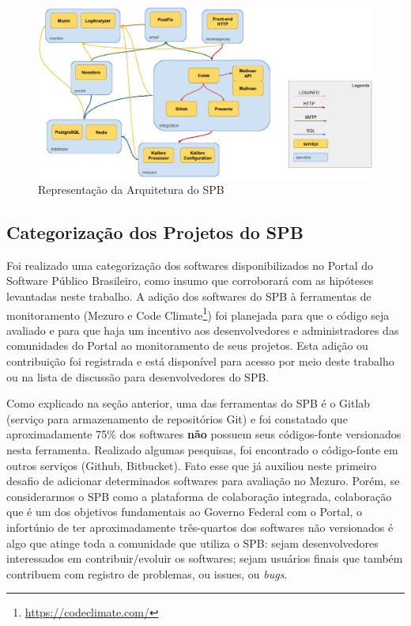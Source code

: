 \begin{figure}[!htb]
	\centering
    \includegraphics[keepaspectratio=true,scale=0.3]
    {figuras/arquitetura_spb.eps}
  \caption{Representação da Arquitetura do SPB}
  \label{fig:arquitetura_spb}
\end{figure}

\subsection{Categorização dos Projetos do SPB}

Foi realizado uma categorização dos softwares disponibilizados no Portal do
Software Público Brasileiro, como insumo que corroborará com as hipóteses
levantadas neste trabalho. A adição dos softwares do SPB à ferramentas de
monitoramento (Mezuro e Code Climate\footnote{\url{https://codeclimate.com/}})
foi planejada para que o código seja avaliado e para que haja um incentivo aos
desenvolvedores e administradores das comunidades do Portal ao monitoramento de
seus projetos. Esta adição ou contribuição foi registrada e está disponível
para acesso por meio deste trabalho ou na lista de discussão para
desenvolvedores do SPB.

Como explicado na seção anterior, uma das ferramentas do SPB é o Gitlab
(serviço para armazenamento de repositórios Git) e foi constatado que
aproximadamente 75\% dos softwares \textbf{não} possuem seus códigos-fonte
versionados nesta ferramenta. Realizado algumas pesquisas, foi encontrado o
código-fonte em outros serviços (Github, Bitbucket). Fato esse que já auxiliou
neste primeiro desafio de adicionar determinados softwares para avaliação no
Mezuro. Porém, se considerarmos o SPB como a plataforma de colaboração
integrada, colaboração que é um dos objetivos fundamentais ao Governo Federal
com o Portal, o infortúnio de ter aproximadamente três-quartos dos softwares
não versionados é algo que atinge toda a comunidade que utiliza o SPB: sejam
desenvolvedores interessados em contribuir/evoluir os softwares; sejam usuários
finais que também contribuem com registro de problemas, ou issues, ou \textit{bugs}.

